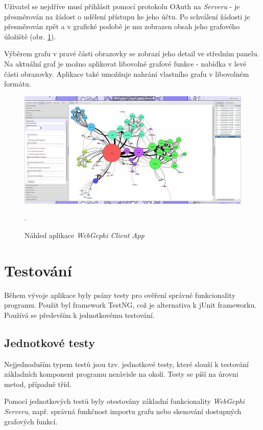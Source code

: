 \documentclass[thesis=M,czech]{FITthesis}[2014/05/6]
\begin{document}
Uživatel se nejdříve musí přihlásit pomocí protokolu OAuth na \textit{Serveru} - je přesměrován na žádost o udělení přístupu ke jeho účtu. Po schválení žádosti je
přesměrován zpět a v grafické podobě je mu zobrazen obsah jeho grafového úložiště (obr. \ref{fig:clientapp-overview}). 

Výběrem grafu v pravé části obrazovky se zobrazí jeho detail ve středním panelu. Na aktuální graf je možno aplikovat libovolné grafové funkce - nabídka v levé části obrazovky.
Aplikace také umožňuje nahrání vlastního grafu v libovolném formátu. 

\begin{figure}\centering
 	\includegraphics[width=1\textwidth]{images/prtsc/clientapp-overview}
 	\caption[Náhled aplikace \textit{WebGephi Client App}]{Náhled aplikace \textit{WebGephi Client App}}.\label{fig:clientapp-overview}
\end{figure}

\chapter{Testování}
Během vývoje aplikace byly psány testy pro ověření správné funkcionality
programu. Použit byl framework TestNG\cite{testng}, což je alternativa k jUnit
frameworku. Používá se především k jednotkovému testování.

\section{Jednotkové testy}
Nejjednoduším typem testů jsou tzv. jednotkové testy, které slouží k testování
základních komponent programu nezávisle na okolí. Testy se píší na úrovni
metod, případně tříd.

Pomocí jednotkových testů byly otestovány základní funkcionality
\textit{WebGephi Serveru}, např. správná funkčnost importu grafu nebo skenování
dostupných grafových funkcí.
\end{document}
